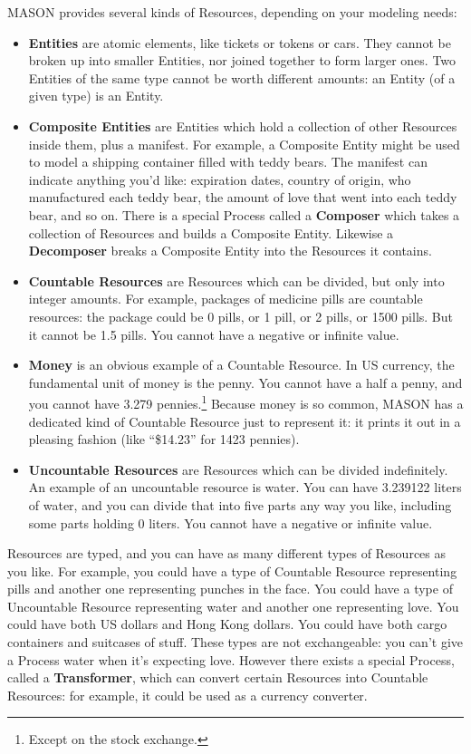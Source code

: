 \documentclass[twoside,10pt]{article}
\begin{document}
MASON provides several kinds of Resources, depending on your modeling needs:

\begin{itemize}
\item {\bf Entities} are atomic elements, like tickets or tokens or cars.  They cannot be broken up into smaller Entities, nor joined together to form larger ones.  Two Entities of the same type cannot be worth different amounts: an Entity (of a given type) is an Entity.
\item {\bf Composite Entities} are Entities which hold a collection of other Resources inside them, plus a manifest.  For example, a Composite Entity might be used to model a shipping container filled with teddy bears.  The manifest can indicate anything you'd like: expiration dates, country of origin, who manufactured each teddy bear, the amount of love that went into each teddy bear, and so on.  There is a special Process called a {\bf Composer} which takes a collection of Resources and builds a Composite Entity.  Likewise a {\bf Decomposer} breaks a Composite Entity into the Resources it contains.
\item {\bf Countable Resources} are Resources which can be divided, but only into integer amounts.  For example, packages of medicine pills are countable resources: the package could be 0 pills, or 1 pill, or 2 pills, or 1500 pills.  But it cannot be 1.5 pills.  You cannot have a negative or infinite value.
\item {\bf Money} is an obvious example of a Countable Resource.  In US currency, the fundamental unit of money is the penny.  You cannot have a half a penny, and you cannot have 3.279 pennies.\footnote{Except on the stock exchange.}  Because money is so common, MASON has a dedicated kind of Countable Resource just to represent it: it prints it out in a pleasing fashion (like ``\$14.23'' for 1423 pennies). 
\item {\bf Uncountable Resources} are Resources which can be divided indefinitely.  An example of an uncountable resource is water.  You can have 3.239122 liters of water, and you can divide that into five parts any way you like, including some parts holding 0 liters.  You cannot have a negative or infinite value.
\end{itemize}

Resources are typed, and you can have as many different types of Resources as you like.  For example, you could have a type of Countable Resource representing pills and another one representing punches in the face.  You could have a type of Uncountable Resource representing water and another one representing love.  You could have both US dollars and Hong Kong dollars.  You could have both cargo containers and suitcases of stuff.  These types are not exchangeable: you can't give a Process water when it's expecting love.  However there exists a special Process, called a {\bf Transformer}, which can convert certain Resources into Countable Resources: for example, it could be used as a currency converter.     
\end{document}
